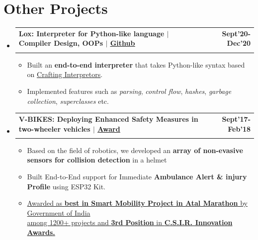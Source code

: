 \documentclass[letterpaper,10pt]{article}
\makeatletter
\newcommand{\resumeItem}[1]{
  \item\small{
    {#1 \vspace{-2pt}}
  }
}
\newcommand{\resumeSubheading}[4]{
  \vspace{-2pt}\item
    \begin{tabular*}{1.0\textwidth}[t]{l@{\extracolsep{\fill}}r}
      \textbf{#1} & \textbf{\small #2} \\
      \textit{\small#3} & \textit{\small #4} \\
    \end{tabular*}\vspace{-7pt}
}
\newcommand{\resumeSubHeadingListStart}{\begin{itemize}[leftmargin=0.0in, label={}]}
\newcommand{\resumeSubHeadingListEnd}{\end{itemize}}
\newcommand{\resumeItemListStart}{\begin{itemize}}
\newcommand{\resumeItemListEnd}{\end{itemize}\vspace{-5pt}}
\makeatother
\begin{document}
\section{Other Projects}
  \resumeSubHeadingListStart
    \resumeSubheading
      {Lox: Interpreter for Python-like language $|$ Compiler Design, OOPs $|$ \href{https://github.com/gyanigk/Lox}{\underline{Github}}}{Sept'20-Dec'20}
      {}{}
      \vspace{-18pt}
      \resumeItemListStart
        \resumeItem{Built an \textbf{end-to-end interpreter} that takes Python-like syntax based on \href{https://craftinginterpreters.com/}{\underline{Crafting Interpretors}}.}
        \resumeItem{Implemented features such as \textit{parsing}, \textit{control flow}, \textit{hashes}, \textit{garbage collection}, \textit{superclasses} etc.}
      \resumeItemListEnd

    \resumeSubheading
      {V-BIKES: Deploying Enhanced Safety Measures in two-wheeler vehicles $|$ \href{https://drive.google.com/file/d/1kB5Lr3pf-EXvssMpe6t8tkbkbpHlXwFj/view?usp=share_link}{\underline{Award}}}{Sept'17-Feb'18}
      {}{}
      \vspace{-18pt}
      \resumeItemListStart
        \resumeItem{Based on the field of robotics, we developed an \textbf{array of non-evasive sensors for collision detection} in a helmet}
        \resumeItem{Built End-to-End support for Immediate \textbf{Ambulance Alert \& injury Profile} using ESP32 Kit.}
        \resumeItem{{\href{https://drive.google.com/file/d/1JOfyKVWSockjHTPi5B7Y7iNZmLMB-D6l/view?usp=share_link}{Awarded as \textbf{\underline{best in Smart Mobility Project in Atal Marathon}}  by Government of India \\among 1200+ projects and \textbf{3rd Position} in \textbf{C.S.I.R. Innovation Awards.}}} \\}
        
        
      \resumeItemListEnd
    
  \resumeSubHeadingListEnd
\vspace{-14pt}
\end{document}
